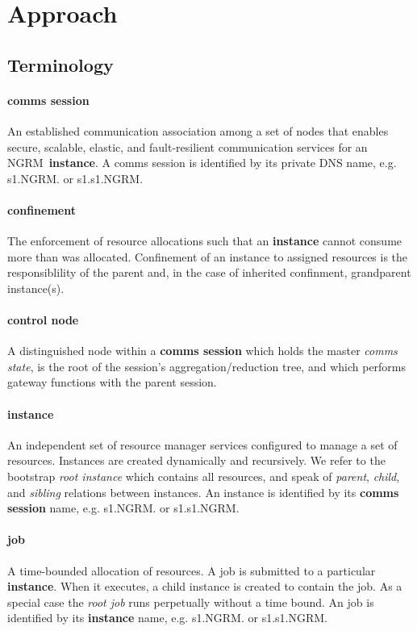 \documentclass{article}
\newcommand{\ngrm}{NGRM}
\begin{document}
\section{Approach}
\subsection{Terminology}

\paragraph{comms session}
An established communication association among a set of nodes that
enables secure, scalable, elastic, and fault-resilient communication
services for an \ngrm\ {\bf instance}.
A comms session is identified by its private DNS name, e.g. s1.\ngrm.
or s1.s1.\ngrm.

\paragraph{confinement}
The enforcement of resource allocations such that an {\bf instance} cannot
consume more than was allocated.  Confinement of an instance to assigned
resources is the responsiblility of the parent and, in the case of inherited
confinment, grandparent instance(s).

\paragraph{control node}
A distinguished node within a {\bf comms session} which holds the master
{\em comms state}, is the root of the session's aggregation/reduction tree,
and which performs gateway functions with the parent session.

\paragraph{instance}
An independent set of resource manager services configured to manage
a set of resources.
Instances are created dynamically and recursively.
We refer to the bootstrap {\em root instance} which contains all resources,
and speak of {\em parent}, {\em child}, and {\em sibling} relations between
instances.
An instance is identified by its {\bf comms session} name,
e.g. s1.\ngrm.  or s1.s1.\ngrm.

\paragraph{job}
A time-bounded allocation of resources.  A job is submitted to a
particular {\bf instance}.  When it executes, a child instance is
created to contain the job.  As a special case the {\em root job} 
runs perpetually without a time bound.
An job is identified by its {\bf instance} name,
e.g. s1.\ngrm.  or s1.s1.\ngrm.
\end{document}
